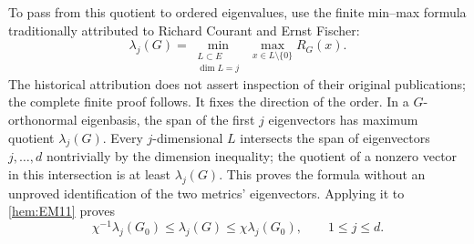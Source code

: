 \documentclass[11pt]{article}
\begin{document}
To pass from this quotient to ordered eigenvalues, use the finite min--max
formula traditionally attributed to Richard Courant and Ernst Fischer:
\[
 \lambda_j(G)=
 \min_{\substack{L\subset E\\\dim L=j}}\ 
 \max_{x\in L\setminus\{0\}} R_G(x).
\]
The historical attribution does not assert inspection of their original
publications; the complete finite proof follows. It fixes the direction of
the order. In a
\(G\)-orthonormal eigenbasis, the span of the first \(j\) eigenvectors
has maximum quotient \(\lambda_j(G)\). Every \(j\)-dimensional \(L\)
intersects the span of eigenvectors \(j,\ldots,d\) nontrivially by the
dimension inequality; the quotient of a nonzero vector in this
intersection is at least \(\lambda_j(G)\). This proves the formula
without an unproved identification of the two metrics' eigenvectors.
Applying it to \eqref{hem:EM11} proves
\begin{equation}
 \chi^{-1}\lambda_j(G_0)\le\lambda_j(G)
          \le\chi\lambda_j(G_0),\qquad 1\le j\le d.
 \tag{EM12}\label{hem:EM12}
\end{equation}
\end{document}
